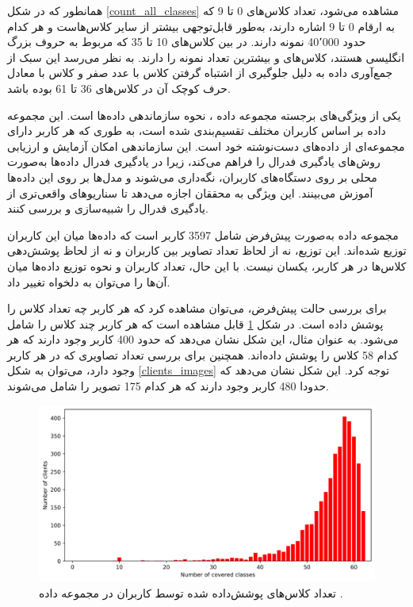 همانطور که در شکل
\ref{count_all_classes}
مشاهده می‌شود، تعداد کلاس‌های 0 تا 9 که به ارقام 0 تا 9 اشاره دارند، به‌طور قابل‌توجهی بیشتر از سایر کلاس‌هاست و هر کدام حدود 40٬000 نمونه دارند. در بین کلاس‌های 10 تا 35 که مربوط به حروف بزرگ انگلیسی هستند، کلاس‌های  و  بیشترین تعداد نمونه را دارند. به نظر می‌رسد این سبک از جمع‌آوری داده به دلیل جلوگیری از اشتباه گرفتن کلاس  با عدد صفر و کلاس  با معادل حرف کوچک آن در کلاس‌های 36 تا 61 بوده باشد.


یکی از ویژگی‌های برجسته مجموعه داده
،
نحوه سازماندهی داده‌ها است. این مجموعه داده بر اساس کاربران مختلف تقسیم‌بندی شده است، به طوری که هر کاربر دارای مجموعه‌ای از داده‌های دست‌نوشته خود است. این سازماندهی امکان آزمایش و ارزیابی روش‌های یادگیری فدرال را فراهم می‌کند، زیرا در یادگیری فدرال داده‌ها به‌صورت محلی بر روی دستگاه‌های کاربران، نگه‌داری می‌شوند و مدل‌ها بر روی این داده‌ها آموزش می‌بینند. این ویژگی به محققان اجازه می‌دهد تا سناریوهای واقعی‌تری از یادگیری فدرال را شبیه‌سازی و بررسی کنند.

مجموعه داده
به‌صورت پیش‌فرض شامل 3597 کاربر است که داده‌ها میان این کاربران توزیع شده‌اند. این توزیع، نه از لحاظ تعداد تصاویر بین کاربران و نه از لحاظ پوشش‌دهی کلاس‌ها در هر کاربر، یکسان نیست. با این حال، تعداد کاربران و نحوه توزیع داده‌ها میان آن‌ها را می‌توان به دلخواه تغییر داد.

برای بررسی حالت پیش‌فرض، می‌توان مشاهده کرد که هر کاربر چه تعداد کلاس را پوشش داده است. در شکل
\ref{clients_cover_classes}
قابل مشاهده است که هر کاربر چند کلاس را شامل می‌شود. به عنوان مثال، این شکل نشان می‌دهد که حدود 400 کاربر وجود دارند که هر کدام 58 کلاس را پوشش داده‌اند. همچنین برای بررسی تعداد تصاویری که در هر کاربر وجود دارد، می‌توان به شکل
\ref{clients_images}
توجه کرد. این شکل نشان می‌دهد که حدودا 480 کاربر وجود دارند که هر کدام 175 تصویر را شامل می‌شوند.



\begin{figure}[t]
	\centering
	\includegraphics[scale=0.7]{images/chap5/clients_cover_classes.png}%
	\caption{%
تعداد کلاس‌های پوشش‌داده شده توسط کاربران در مجموعه داده
		.
	}
	\label{clients_cover_classes}
	\centering
\end{figure}


